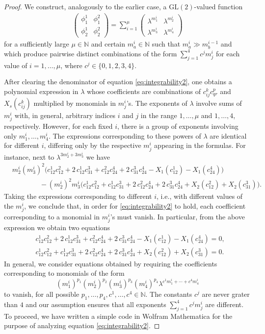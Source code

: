 \documentclass[11pt]{amsart}
\theoremstyle{definition}
\newcommand{\N}{\mathbb{N}}
\begin{document}
\begin{proof}
We construct, analogously to the earlier case, a $\mathrm{GL}(2)$-valued function
\begin{align*}
\begin{pmatrix}
    \phi^1_1 & \phi_1^2\\
    \phi^1_2 & \phi^2_2
\end{pmatrix}=\sum_{i=1}^\mu\begin{pmatrix}
    \lambda^{m_1^i} & \lambda^{m_2^i}\\
    \lambda^{m_3^i} & \lambda^{m_4^i}
\end{pmatrix}\end{align*}
for a sufficiently large $\mu\in\N$ and certain $m_a^i\in\N$ such that $m_a^i\gg m_b^{i-1}$ and which produce pairwise distinct combinations of the form $\sum_{j=1}^4c^jm_j^i$ for each value of $i=1,\ldots,\mu$, where $c^j\in\{0,1,2,3,4\}$.

After clearing the denominator of equation \eqref{eq:integrability2}, one obtains a polynomial expression in $\lambda$ whose coefficients are combinations of $c^k_{ij}c^p_{qr}$ and  $X_s(c^k_{ij})$ multiplied by monomials in $m^i_j$'s. The exponents of $\lambda$ involve sums of $m^i_j$ with, in general, arbitrary indices $i$ and $j$ in the range $1,\ldots,\mu$ and $1,\ldots,4$, respectively. However, for each fixed $i$, there is a group of exponents involving only $m^i_1,\ldots, m^i_4$. The expressions corresponding to these powers of $\lambda$ are identical for different $i$, differing only by the respective $m^i_j$ appearing in the formulas. For instance, next to $\lambda^{3m^i_2+3m^i_3}$ we have
\[
\begin{aligned}
&m^i_2(m^i_3)^2 \Big(c^1_{12}c^2_{12}+ 2\,c^1_{12}c^3_{31}+ c^2_{12}c^4_{24}+ 2\,c^3_{31}c^4_{24}- X_1(c^1_{12})-X_1(c^4_{24})\Big)\\
&\qquad\qquad
- (m^i_2)^2m^i_3 \Big(c^1_{12}c^2_{12}+ c^1_{12}c^3_{31}+ 2\,c^2_{12}c^4_{24}+ 2\,c^3_{31}c^4_{24}+ X_2(c^2_{12})+ X_2(c^3_{31})\Big).
\end{aligned}
\]
Taking the expressions corresponding to different $i$, i.e., with different values of the $m^i_j$, we conclude that, in order for \eqref{eq:integrability2} to hold, each coefficient corresponding to a monomial in $m^i_j$'s must vanish. In particular, from the above expression we obtain two equations
\[
\begin{aligned}
&c^1_{12}c^2_{12}+ 2\,c^1_{12}c^3_{31}+ c^2_{12}c^4_{24}+ 2\,c^3_{31}c^4_{24}- X_1(c^1_{12})- X_1(c^4_{24})=0,\\
&c^1_{12}c^2_{12}+ c^1_{12}c^3_{31}+ 2\,c^2_{12}c^4_{24}+ 2\,c^3_{31}c^4_{24}+ X_2(c^2_{12})+ X_2(c^3_{31})=0.
\end{aligned}
\]
In general, we consider equations obtained by requiring the coefficients corresponding to monomials of the form
\[
(m^i_1)^{p_1}(m^i_2)^{p_2}(m^i_3)^{p_3}(m^i_4)^{p_4}\lambda^{c^1m^i_1+\cdots+c^4m^i_4}
\]
to vanish, for all possible $p_1,\ldots,p_4, c^1,\ldots,c^4 \in \N$. The constants $c^j$ are never grater than $4$ and our assumption ensures that all exponents $\sum_{j=1}^4c^jm_j^i$ are different. To proceed, we have written a simple code in Wolfram Mathematica for the purpose of analyzing equation \eqref{eq:integrability2}. 


\end{proof}
\end{document}

